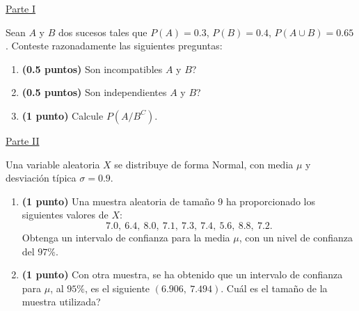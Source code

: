 
\noindent\underline{Parte I}

Sean $A$ y $B$ dos sucesos tales que $P(A)=0.3$, $P(B)=0.4$, $P(A\cup B)=0.65$. Conteste razonadamente las siguientes preguntas:
\begin{enumerate}[label=\alph*)]
\item \textbf{(0.5 puntos)} \textquestiondown{}Son incompatibles $A$ y $B$?
\item \textbf{(0.5 puntos)} \textquestiondown{}Son independientes $A$ y $B$?
\item \textbf{(1 punto)} Calcule $P(A/B^C)$.
\end{enumerate}
\par\noindent\begin{minipage}{\linewidth}
\noindent\underline{Parte II}

Una variable aleatoria $X$ se distribuye de forma Normal, con media $\mu$ y desviación típica $\sigma=0.9$.
\begin{enumerate}[label=\alph*)]
\item \textbf{(1 punto)} Una muestra aleatoria de tamaño 9 ha proporcionado los siguientes valores de $X$:
\[
7.0,\ 6.4,\ 8.0,\ 7.1,\ 7.3,\ 7.4,\ 5.6,\ 8.8,\ 7.2.
\]
Obtenga un intervalo de confianza para la media $\mu$, con un nivel de confianza del $97\%$.
\item \textbf{(1 punto)} Con otra muestra, se ha obtenido que un intervalo de confianza para $\mu$, al $95\%$, es el siguiente $(6.906,\ 7.494)$. \textquestiondown{}Cuál es el tamaño de la muestra utilizada?
\end{enumerate}
\end{minipage}\par

